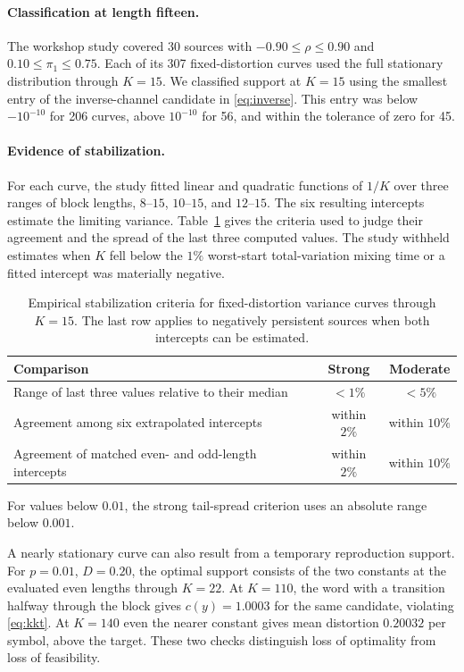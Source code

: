 \documentclass[11pt,letterpaper]{article}
\theoremstyle{definition}
\begin{document}
\paragraph{Classification at length fifteen.}
The workshop study \cite{itw} covered 30 sources with $-0.90\le\rho\le0.90$ and $0.10\le\pi_1\le0.75$. Each of its 307 fixed-distortion curves used the full stationary distribution through $K=15$. We classified support at $K=15$ using the smallest entry of the inverse-channel candidate in \eqref{eq:inverse}. This entry was below $-10^{-10}$ for 206 curves, above $10^{-10}$ for 56, and within the tolerance of zero for 45.

\paragraph{Evidence of stabilization.}
For each curve, the study fitted linear and quadratic functions of $1/K$ over three ranges of block lengths, $8$--$15$, $10$--$15$, and $12$--$15$. The six resulting intercepts estimate the limiting variance. Table~\ref{tab:stability} gives the criteria used to judge their agreement and the spread of the last three computed values. The study withheld estimates when $K$ fell below the $1\%$ worst-start total-variation mixing time or a fitted intercept was materially negative.

\begin{table}[htbp]\centering\small
\caption{Empirical stabilization criteria for fixed-distortion variance curves through $K=15$. The last row applies to negatively persistent sources when both intercepts can be estimated.}
\label{tab:stability}
\begin{tabularx}{\linewidth}{@{}Xcc@{}}\toprule
Comparison & Strong & Moderate\\\midrule
Range of last three values relative to their median & $<1\%$ & $<5\%$\\
Agreement among six extrapolated intercepts & within $2\%$ & within $10\%$\\
Agreement of matched even- and odd-length intercepts & within $2\%$ & within $10\%$\\\bottomrule
\end{tabularx}
\par\smallskip\raggedright For values below $0.01$, the strong tail-spread criterion uses an absolute range below $0.001$.
\end{table}

A nearly stationary curve can also result from a temporary reproduction support. For $p=0.01$, $D=0.20$, the optimal support consists of the two constants at the evaluated even lengths through $K=22$. At $K=110$, the word with a transition halfway through the block gives $c(y)=1.0003$ for the same candidate, violating \eqref{eq:kkt}. At $K=140$ even the nearer constant gives mean distortion $0.20032$ per symbol, above the target. These two checks distinguish loss of optimality from loss of feasibility.
\end{document}
